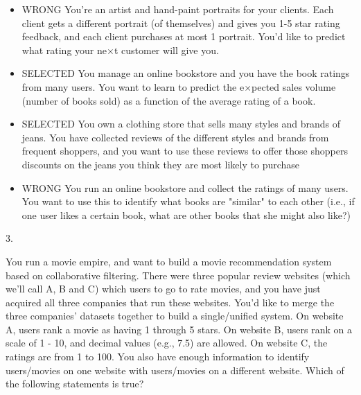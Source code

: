 \begin{itemize}
\item WRONG You're an artist and hand-paint portraits for your clients. Each client gets a different portrait (of themselves) and gives you 1-5 star rating feedback, and each client purchases at most 1 portrait. You'd like to predict what rating your ne$ \times $t customer will give you.

\item SELECTED You manage an online bookstore and you have the book ratings from many users. You want to learn to predict the e$ \times $pected sales volume (number of books sold) as a function of the average rating of a book.

\item SELECTED You own a clothing store that sells many styles and brands of jeans. You have collected reviews of the different styles and brands from frequent shoppers, and you want to use these reviews to offer those shoppers discounts on the jeans you think they are most likely to purchase

\item WRONG You run an online bookstore and collect the ratings of many users. You want to use this to identify what books are "similar" to each other (i.e., if one user likes a certain book, what are other books that she might also like?)
\end{itemize}

3. 

You run a movie empire, and want to build a movie recommendation system based on collaborative filtering. There were three popular review websites (which we'll call A, B and C) which users to go to rate movies, and you have just acquired all three companies that run these websites. You'd like to merge the three companies' datasets together to build a single/unified system. On website A, users rank a movie as having 1 through 5 stars. On website B, users rank on a scale of 1 - 10, and decimal values (e.g., 7.5) are allowed. On website C, the ratings are from 1 to 100. You also have enough information to identify users/movies on one website with users/movies on a different website. Which of the following statements is true?

